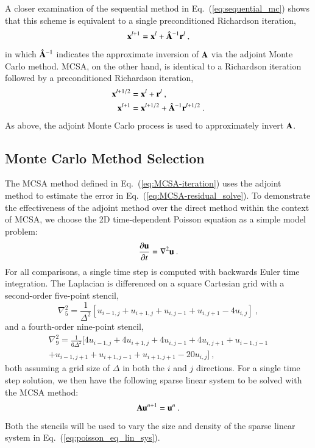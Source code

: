 \documentclass[preprint,12pt]{elsarticle}
\newcommand{\vA}{\ensuremath{\ve{A}}}
\newcommand{\vx}{\ensuremath{\ve{x}}}
\newcommand{\vr}{\ensuremath{\ve{r}}}
\newcommand{\vu}{\ensuremath{\ve{u}}}
\begin{document}
A closer examination of the sequential method in Eq.~(\ref{eq:sequential_mc})
shows that this scheme is equivalent to a single preconditioned Richardson
iteration,
\begin{equation}
  \vx^{l+1} = \vx^{l} + \hat{\vA}^{-1}\vr^l\:,
\end{equation}
in which $\hat{\vA}^{-1}$ indicates the approximate inversion of $\vA$ via the
adjoint Monte Carlo method.  MCSA, on the other hand, is identical to a
Richardson iteration followed by a preconditioned Richardson iteration,
\begin{align}
  \vx^{l+1/2} &= \vx^{l} + \vr^{l}\:,\\
  \vx^{l+1} &= \vx^{l+1/2} + \hat{\vA}^{-1}\vr^{l+1/2}\:.
\end{align}
As above, the adjoint Monte Carlo process is used to approximately invert
$\vA$.


\subsection{Monte Carlo Method Selection}

The MCSA method defined in Eq.~(\ref{eq:MCSA-iteration}) uses the adjoint
method to estimate the error in Eq.~(\ref{eq:MCSA-residual_solve}).
To demonstrate the
effectiveness of the adjoint method over the direct method within the context
of MCSA, we choose the 2D time-dependent Poisson equation as a
simple model problem:
\begin{equation}
  \frac{\partial \vu}{\partial t} = \nabla^2 \vu\:.
  \label{eq:poisson_equation}
\end{equation}
For all comparisons, a single time step is computed with backwards Euler time
integration. The Laplacian is differenced on a square Cartesian grid with a
second-order five-point stencil,
\begin{equation}
  \nabla^2_5 = \frac{1}{\Delta^2}[u_{i-1,j} + u_{i+1,j} + u_{i,j-1} +
    u_{i,j+1} - 4 u_{i,j}]\:,
  \label{eq:five_point_stencil}
\end{equation}
and a fourth-order nine-point stencil,
\begin{multline}
  \nabla^2_9 = \frac{1}{6\Delta^2}[4 u_{i-1,j} + 4 u_{i+1,j} + 4
    u_{i,j-1} + 4 u_{i,j+1} + u_{i-1,j-1}\\ + u_{i-1,j+1} +
    u_{i+1,j-1} + u_{i+1,j+1} - 20 u_{i,j}]\:,
  \label{eq:nine_point_stencil}
\end{multline}
both assuming a grid size of $\Delta$ in both the $i$ and $j$ directions. For
a single time step solution, we then have the following sparse linear system
to be solved with the MCSA method:
\begin{equation}
  \vA \vu^{n+1} = \vu^n\:.
  \label{eq:poisson_eq_lin_sys}
\end{equation}
Both the stencils will be used to vary the size and density of the sparse
linear system in Eq.~(\ref{eq:poisson_eq_lin_sys}).
\end{document}
